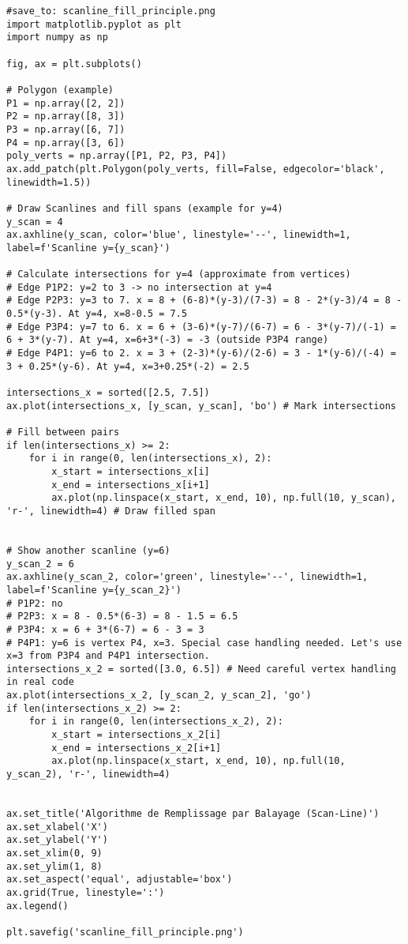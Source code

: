 \documentclass{article}
\begin{document}
\begin{verbatim}
#save_to: scanline_fill_principle.png
import matplotlib.pyplot as plt
import numpy as np

fig, ax = plt.subplots()

# Polygon (example)
P1 = np.array([2, 2])
P2 = np.array([8, 3])
P3 = np.array([6, 7])
P4 = np.array([3, 6])
poly_verts = np.array([P1, P2, P3, P4])
ax.add_patch(plt.Polygon(poly_verts, fill=False, edgecolor='black', linewidth=1.5))

# Draw Scanlines and fill spans (example for y=4)
y_scan = 4
ax.axhline(y_scan, color='blue', linestyle='--', linewidth=1, label=f'Scanline y={y_scan}')

# Calculate intersections for y=4 (approximate from vertices)
# Edge P1P2: y=2 to 3 -> no intersection at y=4
# Edge P2P3: y=3 to 7. x = 8 + (6-8)*(y-3)/(7-3) = 8 - 2*(y-3)/4 = 8 - 0.5*(y-3). At y=4, x=8-0.5 = 7.5
# Edge P3P4: y=7 to 6. x = 6 + (3-6)*(y-7)/(6-7) = 6 - 3*(y-7)/(-1) = 6 + 3*(y-7). At y=4, x=6+3*(-3) = -3 (outside P3P4 range)
# Edge P4P1: y=6 to 2. x = 3 + (2-3)*(y-6)/(2-6) = 3 - 1*(y-6)/(-4) = 3 + 0.25*(y-6). At y=4, x=3+0.25*(-2) = 2.5

intersections_x = sorted([2.5, 7.5])
ax.plot(intersections_x, [y_scan, y_scan], 'bo') # Mark intersections

# Fill between pairs
if len(intersections_x) >= 2:
    for i in range(0, len(intersections_x), 2):
        x_start = intersections_x[i]
        x_end = intersections_x[i+1]
        ax.plot(np.linspace(x_start, x_end, 10), np.full(10, y_scan), 'r-', linewidth=4) # Draw filled span


# Show another scanline (y=6)
y_scan_2 = 6
ax.axhline(y_scan_2, color='green', linestyle='--', linewidth=1, label=f'Scanline y={y_scan_2}')
# P1P2: no
# P2P3: x = 8 - 0.5*(6-3) = 8 - 1.5 = 6.5
# P3P4: x = 6 + 3*(6-7) = 6 - 3 = 3
# P4P1: y=6 is vertex P4, x=3. Special case handling needed. Let's use x=3 from P3P4 and P4P1 intersection.
intersections_x_2 = sorted([3.0, 6.5]) # Need careful vertex handling in real code
ax.plot(intersections_x_2, [y_scan_2, y_scan_2], 'go')
if len(intersections_x_2) >= 2:
    for i in range(0, len(intersections_x_2), 2):
        x_start = intersections_x_2[i]
        x_end = intersections_x_2[i+1]
        ax.plot(np.linspace(x_start, x_end, 10), np.full(10, y_scan_2), 'r-', linewidth=4)


ax.set_title('Algorithme de Remplissage par Balayage (Scan-Line)')
ax.set_xlabel('X')
ax.set_ylabel('Y')
ax.set_xlim(0, 9)
ax.set_ylim(1, 8)
ax.set_aspect('equal', adjustable='box')
ax.grid(True, linestyle=':')
ax.legend()

plt.savefig('scanline_fill_principle.png')
\end{verbatim}
\end{document}
